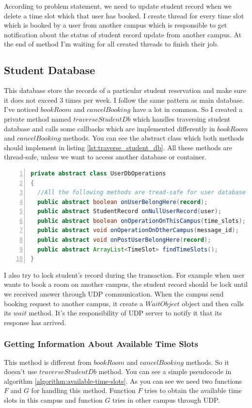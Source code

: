 \documentclass[12pt]{article}
\begin{document}
\par According to problem statement, we need to update student record when we delete a time slot which that user has booked. I create thread for every time slot which is booked by a user from another campus which is responsible to get notification about the status of student record update from another campus. At the end of method I'm waiting for all created threads to finish their job.

\subsection{Student Database}
This database store the records of a particular student reservation and make sure it does not exceed 3 times per week. I follow the same pattern as main database. I've noticed $bookRoom$ and $cancelBooking$ have a lot in common. So I created a private method named $traverseStudentDb$ which handles traversing student database and calls some callbacks which are implemented differently in $bookRoom$ and $cancelBooking$ methods. You can see the abstract class which both methods should implement in listing \ref{lst:traverse_student_db}. All these methods are thread-safe, unless we want to access another database or container.

\begin{lstlisting}[language=java,label={lst:traverse_student_db},caption={UserDbOperations Abstract Class},numbers=left]
private abstract class UserDbOperations
{
  //All the following methods are tread-safe for user database
  public abstract boolean onUserBelongHere(record);
  public abstract StudentRecord onNullUserRecord(user);
  public abstract boolean onOperationOnThisCampus(time_slots);
  public abstract void onOperationOnOtherCampus(message_id); 
  public abstract void onPostUserBelongHere(record);
  public abstract ArrayList<TimeSlot> findTimeSlots();
}
\end{lstlisting}

\par I also try to lock student's record during the transaction. For example when user wants to book a room on another campus, the student record should be lock until we received answer through UDP communication. When the campus send booking request to another campus, it create a $WaitObject$ object and then calls its $wait$ method. It's the responsibility of UDP server to notify it that its response has arrived.

\subsubsection{Getting Information About Available Time Slots}
This method is different from $bookRoom$ and $cancelBooking$ methods. So it doesn't use $traverseStudentDb$ method. You can see a simple pseudocode in algorithm \ref{algorithm:available-time-slots}. As you can see we need two functions $F$ and $G$ for handling this method. Function $F$ tries to obtain the available time slots in this campus and function $G$ tries in other campus through UDP.
\end{document}
